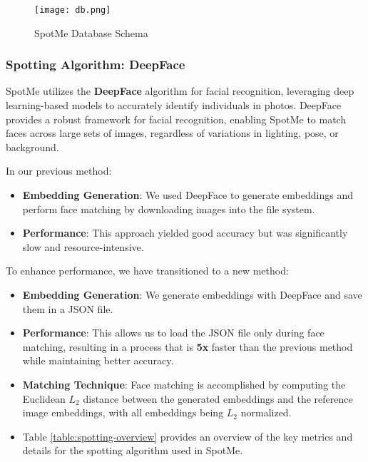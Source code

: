\documentclass[12pt,a4paper]{report}
\begin{document}
\begin{figure}[H]
    \centering
    \texttt{[image: db.png]} %
    \caption{SpotMe Database Schema}
    \label{fig:db-schema}
\end{figure}





\subsubsection{Spotting Algorithm: DeepFace}
SpotMe utilizes the \textbf{DeepFace} algorithm for facial recognition, leveraging deep learning-based models to accurately identify individuals in photos. DeepFace provides a robust framework for facial recognition, enabling SpotMe to match faces across large sets of images, regardless of variations in lighting, pose, or background.

In our previous method:
\begin{itemize}
    \item \textbf{Embedding Generation}: We used DeepFace to generate embeddings and perform face matching by downloading images into the file system.
    \item \textbf{Performance}: This approach yielded good accuracy but was significantly slow and resource-intensive.
\end{itemize}

To enhance performance, we have transitioned to a new method:
\begin{itemize}
    \item \textbf{Embedding Generation}: We generate embeddings with DeepFace and save them in a JSON file.
    \item \textbf{Performance}: This allows us to load the JSON file only during face matching, resulting in a process that is \textbf{5x} faster than the previous method while maintaining better accuracy.
    \item \textbf{Matching Technique}: Face matching is accomplished by computing the Euclidean \(L_2\) distance between the generated embeddings and the reference image embeddings, with all embeddings being \(L_2\) normalized.
\end{itemize}

\begin{itemize}
    \item Table \ref{table:spotting-overview} provides an overview of the key metrics and details for the spotting algorithm used in SpotMe.
\end{itemize}
\end{document}
